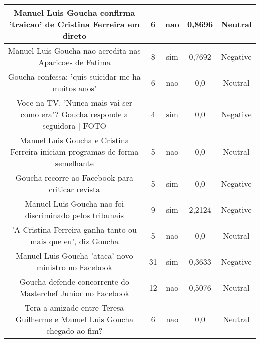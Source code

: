 \documentclass[11pt]{article}
\newlength\mylength
\begin{document}
\begin{center}
\begin{longtable}{||C{.40\mylength}||C{.20\mylength}||C{.20\mylength}||C{.30\mylength}||C{.20\mylength}||}
   Manuel Luis Goucha confirma 'traicao' de Cristina Ferreira em direto  & 6 & nao & 0,8696 & Neutral \\  \hline
   Manuel Luis Goucha nao acredita nas Aparicoes de Fatima  & 8 & sim & 0,7692 & Negative \\  \hline
   Goucha confessa: 'quis suicidar-me ha muitos anos'  & 6 & nao & 0,0 & Neutral \\  \hline
   Voce na TV. 'Nunca mais vai ser como era'? Goucha responde a seguidora | FOTO  & 4 & sim & 0,0 & Negative \\  \hline
   Manuel Luis Goucha e Cristina Ferreira iniciam programas de forma semelhante  & 5 & nao & 0,0 & Neutral \\  \hline
   Goucha recorre ao Facebook para criticar revista  & 5 & sim & 0,0 & Negative \\  \hline
   Manuel Luis Goucha nao foi discriminado pelos tribunais  & 9 & sim & 2,2124 & Negative \\  \hline
   'A Cristina Ferreira ganha tanto ou mais que eu', diz Goucha  & 5 & nao & 0,0 & Neutral \\  \hline
   Manuel Luis Goucha 'ataca' novo ministro no Facebook  & 31 & sim & 0,3633 & Negative \\  \hline
   Goucha defende concorrente do Masterchef Junior no Facebook  & 12 & nao & 0,5076 & Neutral \\  \hline
   Tera a amizade entre Teresa Guilherme e Manuel Luis Goucha chegado ao fim?  & 6 & nao & 0,0 & Neutral \\  \hline

\end{longtable}
\end{center}
\end{document}
